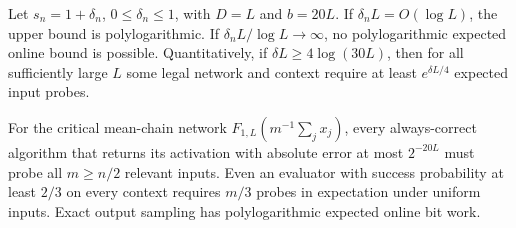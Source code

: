 \begin{corollary}\label{cor:window}
Let \(s_n=1+\delta_n\), \(0\le\delta_n\le1\), with \(D=L\) and
\(b=20L\). If \(\delta_nL=O(\log L)\), the upper bound is
polylogarithmic. If \(\delta_nL/\log L\to\infty\), no polylogarithmic
expected online bound is possible. Quantitatively, if
\(\delta L\ge4\log(30L)\), then for all sufficiently large \(L\)
some legal network and context require at least \(e^{\delta L/4}\)
expected input probes.
\end{corollary}

\begin{proposition}\label{prop:evaluation}
For the critical mean-chain network
\(F_{1,L}(m^{-1}\sum_jx_j)\), every always-correct algorithm that
returns its activation with absolute error at most \(2^{-20L}\)
must probe all \(m\ge n/2\) relevant inputs. Even an evaluator with
success probability at least \(2/3\) on every context requires
\(m/3\) probes in expectation under uniform inputs. Exact output
sampling has polylogarithmic expected online bit work.
\end{proposition}

